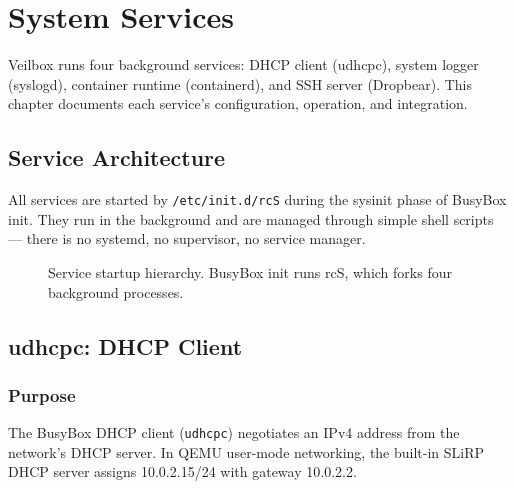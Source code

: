 \chapter{System Services}
\label{ch:services}

Veilbox runs four background services: DHCP client (udhcpc), system logger
(syslogd), container runtime (containerd), and SSH server (Dropbear). This
chapter documents each service's configuration, operation, and integration.

\section{Service Architecture}

All services are started by \texttt{/etc/init.d/rcS} during the sysinit
phase of BusyBox init. They run in the background and are managed through
simple shell scripts --- there is no systemd, no supervisor, no service
manager.

\begin{figure}[H]
\centering
{}
\caption{Service startup hierarchy. BusyBox init runs rcS, which forks
four background processes.}
\label{fig:services}
\end{figure}

\section{udhcpc: DHCP Client}

\subsection{Purpose}

The BusyBox DHCP client (\texttt{udhcpc}) negotiates an IPv4 address from
the network's DHCP server. In QEMU user-mode networking, the built-in SLiRP
DHCP server assigns 10.0.2.15/24 with gateway 10.0.2.2.

